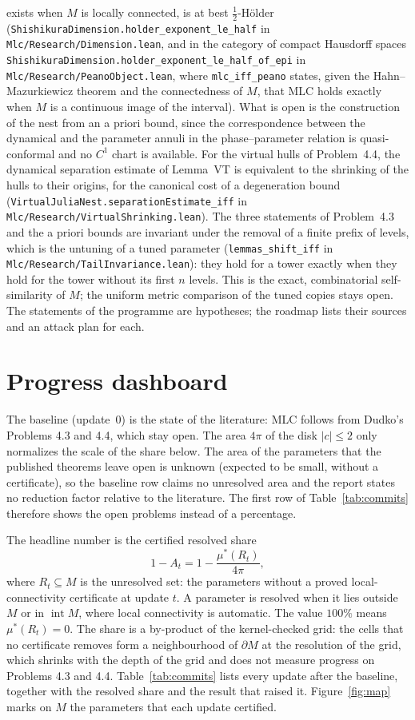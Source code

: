 \documentclass[11pt,a4paper]{article}
\begin{document}
exists when \(M\) is locally connected, is
at best \(\tfrac12\)-H\"older (\texttt{ShishikuraDimension.holder\_exponent\_le\_half} in
\texttt{Mlc/Research/Dimension.lean}, and in the category of compact Hausdorff spaces
\texttt{ShishikuraDimension.holder\_exponent\_le\_half\_of\_epi} in
\texttt{Mlc/Research/PeanoObject.lean}, where \texttt{mlc\_iff\_peano} states, given the
Hahn--Mazurkiewicz theorem and the connectedness of \(M\), that MLC holds exactly when \(M\) is a
continuous image of the interval). What
is open is the construction of the nest from an a priori bound, since the correspondence between
the dynamical and the parameter annuli in the phase--parameter relation is quasi-conformal and no
\(C^1\) chart is available. For the
virtual hulls of Problem~4.4, the dynamical separation estimate of Lemma~VT is
equivalent to the shrinking of the hulls to their origins, for the canonical cost of a degeneration
bound (\texttt{VirtualJuliaNest.separationEstimate\_iff} in
\texttt{Mlc/Research/VirtualShrinking.lean}). The three statements of Problem~4.3 and the a priori
bounds are invariant under the removal of a finite prefix of levels, which is the
untuning of a tuned parameter (\texttt{lemmas\_shift\_iff} in
\texttt{Mlc/Research/TailInvariance.lean}): they hold for a tower exactly when they hold
for the tower without its first \(n\) levels. This is the exact, combinatorial
self-similarity of \(M\); the uniform metric comparison of the tuned copies stays open.
The statements of the programme
are hypotheses; the roadmap lists their sources and an attack plan for each.

\section{Progress dashboard}

The baseline (update~0) is the state of the literature: MLC follows from Dudko's
Problems 4.3 and 4.4, which stay open. The area \(4\pi\) of the disk \(|c|\le 2\)
only normalizes the scale of the share below. The area of the parameters that the
published theorems leave open is unknown (expected to be small, without a
certificate), so the baseline row claims no unresolved area and the report states no
reduction factor relative to the literature. The first row of
Table~\ref{tab:commits} therefore shows the open problems instead of a
percentage.

The headline number is the certified resolved share
\[
  1-A_t=1-\frac{\mu^*(R_t)}{4\pi},
\]
where \(R_t\subseteq M\) is the unresolved set: the parameters without a
proved local-connectivity certificate at update \(t\). A parameter is resolved
when it lies outside \(M\) or in \(\operatorname{int}M\), where local
connectivity is automatic. The value \(100\%\) means \(\mu^*(R_t)=0\).
The share is a by-product of the kernel-checked grid: the cells that no
certificate removes form a neighbourhood of \(\partial M\) at the resolution of the
grid, which shrinks with the depth of the grid and does not measure progress on
Problems 4.3 and 4.4.
Table~\ref{tab:commits} lists every update after the baseline, together with
the resolved share and the result that raised it. Figure~\ref{fig:map} marks
on \(M\) the parameters that each update certified.
\end{document}
